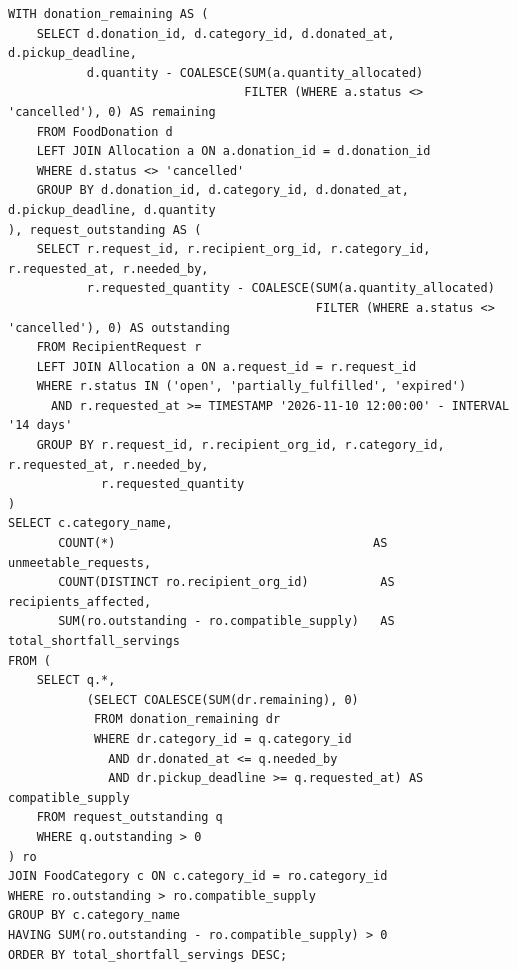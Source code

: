 \documentclass[11pt,letterpaper]{article}
\begin{document}
\begin{lstlisting}
WITH donation_remaining AS (
    SELECT d.donation_id, d.category_id, d.donated_at, d.pickup_deadline,
           d.quantity - COALESCE(SUM(a.quantity_allocated)
                                 FILTER (WHERE a.status <> 'cancelled'), 0) AS remaining
    FROM FoodDonation d
    LEFT JOIN Allocation a ON a.donation_id = d.donation_id
    WHERE d.status <> 'cancelled'
    GROUP BY d.donation_id, d.category_id, d.donated_at, d.pickup_deadline, d.quantity
), request_outstanding AS (
    SELECT r.request_id, r.recipient_org_id, r.category_id, r.requested_at, r.needed_by,
           r.requested_quantity - COALESCE(SUM(a.quantity_allocated)
                                           FILTER (WHERE a.status <> 'cancelled'), 0) AS outstanding
    FROM RecipientRequest r
    LEFT JOIN Allocation a ON a.request_id = r.request_id
    WHERE r.status IN ('open', 'partially_fulfilled', 'expired')
      AND r.requested_at >= TIMESTAMP '2026-11-10 12:00:00' - INTERVAL '14 days'
    GROUP BY r.request_id, r.recipient_org_id, r.category_id, r.requested_at, r.needed_by,
             r.requested_quantity
)
SELECT c.category_name,
       COUNT(*)                                    AS unmeetable_requests,
       COUNT(DISTINCT ro.recipient_org_id)          AS recipients_affected,
       SUM(ro.outstanding - ro.compatible_supply)   AS total_shortfall_servings
FROM (
    SELECT q.*,
           (SELECT COALESCE(SUM(dr.remaining), 0)
            FROM donation_remaining dr
            WHERE dr.category_id = q.category_id
              AND dr.donated_at <= q.needed_by
              AND dr.pickup_deadline >= q.requested_at) AS compatible_supply
    FROM request_outstanding q
    WHERE q.outstanding > 0
) ro
JOIN FoodCategory c ON c.category_id = ro.category_id
WHERE ro.outstanding > ro.compatible_supply
GROUP BY c.category_name
HAVING SUM(ro.outstanding - ro.compatible_supply) > 0
ORDER BY total_shortfall_servings DESC;
\end{lstlisting}
\end{document}

